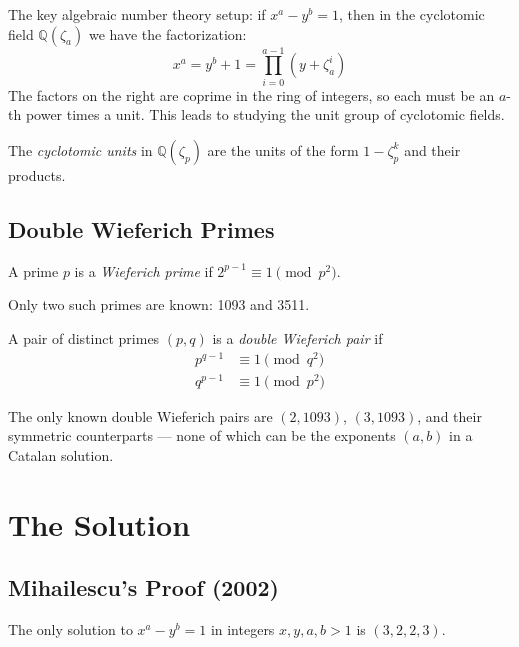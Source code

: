 The key algebraic number theory setup: if $x^a - y^b = 1$, then in the cyclotomic field $\mathbb{Q}(\zeta_a)$ we have the factorization:
\begin{equation}
x^a = y^b + 1 = \prod_{i=0}^{a-1} (y + \zeta_a^i)
\end{equation}
The factors on the right are coprime in the ring of integers, so each must be an $a$-th power times a unit. This leads to studying the unit group of cyclotomic fields.

\begin{definition}
The \emph{cyclotomic units} in $\mathbb{Q}(\zeta_p)$ are the units of the form $1 - \zeta_p^k$ and their products.
\end{definition}

\subsection{Double Wieferich Primes}

\begin{definition}
A prime $p$ is a \emph{Wieferich prime} if $2^{p-1} \equiv 1 \pmod{p^2}$.
\end{definition}

Only two such primes are known: 1093 and 3511.

\begin{definition}
A pair of distinct primes $(p, q)$ is a \emph{double Wieferich pair} if
\begin{align}
p^{q-1} &\equiv 1 \pmod{q^2} \\
q^{p-1} &\equiv 1 \pmod{p^2}
\end{align}
\end{definition}

The only known double Wieferich pairs are $(2, 1093)$, $(3, 1093)$, and their symmetric counterparts — none of which can be the exponents $(a, b)$ in a Catalan solution.

\section{The Solution}

\subsection{Mihailescu's Proof (2002)}

\begin{theorem}
The only solution to $x^a - y^b = 1$ in integers $x, y, a, b > 1$ is $(3, 2, 2, 3)$.
\end{theorem}

